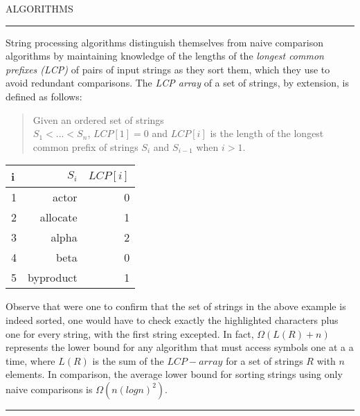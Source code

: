 
\sffamily\normalsize{\color{sciorange}ALGORITHMS}\small\\
\rule[3mm]{190mm}{0.1pt}\vspace{-8mm}
\begin{multicols}{3}
\footnotesize
String processing algorithms distinguish themselves from naive comparison
algorithms by maintaining knowledge of the lengths of the {\em longest common
prefixes (LCP)} of pairs of input strings as they sort them, which they use to
avoid redundant comparisons.  The {\em LCP array} of a set of strings, by
extension, is defined as follows:

\begin{quote}
    Given an ordered set of strings\\ $S_1 < ... < S_n$,
    $LCP[1] = 0$ and $LCP[i]$ is the length of the longest common prefix of
    strings $S_i$ and $S_{i-1}$ when $i > 1$.
\end{quote}

\begin{center}
\begin{tabular}{lrr}
    i&  $S_i$&          $LCP[i]$\\ \hline
    1&  actor&        0\\
    2&  {\color{red}a}llocate&   1\\
    3&  {\color{red}al}pha&      2\\
    4&  beta&         0\\
    5&  {\color{red}b}yproduct&  1\\
\end{tabular}
\end{center}

Observe that were one to confirm that the set of strings in the above example
is indeed sorted, one would have to check exactly the highlighted characters
plus one for every string, with the first string excepted.
In fact, $\Omega(L(R) + n)$ represents the lower bound for any algorithm that must
access symbols one at a a time, where $L(R)$ is the sum of the $LCP-array$ for
a set of strings $R$ with $n$ elements.  In comparison, the
average lower bound for sorting strings using only naive comparisons is
$\Omega(n(log n)^2)$.
\end{multicols}\vspace{-3mm}
\rule[3mm]{190mm}{0.1pt}

